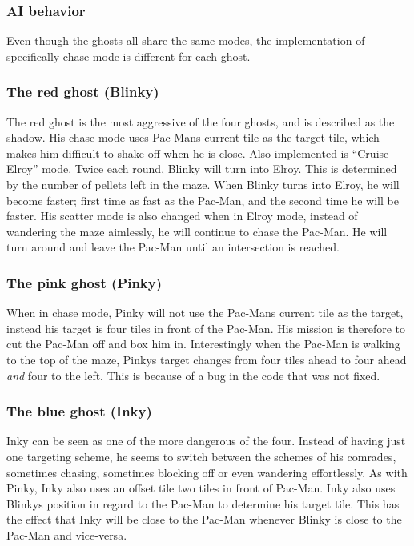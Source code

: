 

\subsubsection{AI behavior}\label{ssec:ai_behavior}
Even though the ghosts all share the same modes, the implementation of specifically chase mode is different for each ghost.

\subsubsection*{The red ghost (Blinky)}
The red ghost is the most aggressive of the four ghosts, and is described as the shadow. His chase mode uses Pac-Mans current tile as the target tile, which makes him difficult to shake off when he is close. Also implemented is “Cruise Elroy” mode. Twice each round, Blinky will turn into Elroy. This is determined by the number of pellets left in the maze. When Blinky turns into Elroy, he will become faster; first time as fast as the Pac-Man, and the second time he will be faster. His scatter mode is also changed when in Elroy mode, instead of wandering the maze aimlessly, he will continue to chase the Pac-Man. He will turn around and leave the Pac-Man until an intersection is reached.

\subsubsection*{The pink ghost (Pinky)}
When in chase mode, Pinky will not use the Pac-Mans current tile as the target, instead his target is four tiles in front of the Pac-Man. His mission is therefore to cut the Pac-Man off and box him in. Interestingly when the Pac-Man is walking to the top of the maze, Pinkys target changes from four tiles ahead to four ahead \textit{and} four to the left. This is because of a bug in the code that was not fixed.

\subsubsection*{The blue ghost (Inky)}
Inky can be seen as one of the more dangerous of the four. Instead of having just one targeting scheme, he seems to switch between the schemes of his comrades, sometimes chasing, sometimes blocking off or even wandering effortlessly. As with Pinky, Inky also uses an offset tile two tiles in front of Pac-Man. Inky also uses Blinkys position in regard to the Pac-Man to determine his target tile. This has the effect that Inky will be close to the Pac-Man whenever Blinky is close to the Pac-Man and vice-versa.

